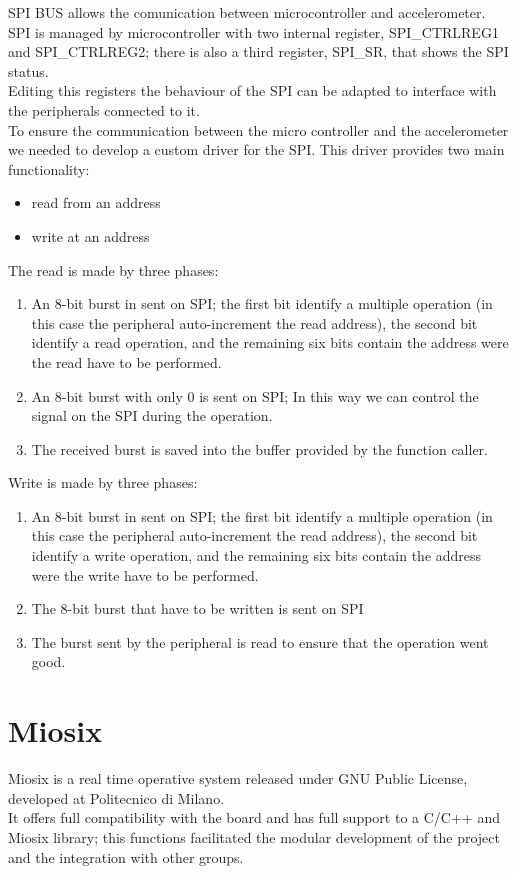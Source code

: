 \documentclass[a4paper,12pt,oneside]{report}
\begin{document}
SPI BUS allows the comunication between microcontroller and accelerometer.
SPI is managed by microcontroller with two internal register,
SPI\_CTRLREG1 and SPI\_CTRLREG2; there is also a third register,
SPI\_SR, that shows the SPI status.\\
Editing this registers the behaviour of the SPI can be adapted to interface with the peripherals connected to it.\\
To ensure the communication between the micro controller and the accelerometer we needed to develop a custom driver
for the SPI. This driver provides two main functionality:
\begin{itemize}
\item read from an address
\item write at an address
\end{itemize}
The read is made by three phases:
\begin{enumerate}
\item An 8-bit burst in sent on SPI; the first bit
identify a multiple operation (in this case the peripheral auto-increment the read address), the second bit identify a read operation,
and the remaining six bits contain the address were the read have to be performed.
\item An 8-bit burst with only 0 is sent on SPI;
In this way we can control the signal on the SPI during the operation.
\item The received burst is saved into the buffer provided by the function caller.
\end{enumerate}
Write is made by three phases:
\begin{enumerate}
\item An 8-bit burst in sent on SPI; the first bit
identify a multiple operation (in this case the peripheral auto-increment the read address), the second bit identify a write operation,
and the remaining six bits contain the address were the write have to be performed.
\item The 8-bit burst that have to be written is sent on SPI
\item The burst sent by the peripheral is read to ensure that the operation went good.
\end{enumerate}

\section{Miosix}

Miosix is a real time operative system released under GNU
Public License, developed at Politecnico di Milano.\\
It offers full compatibility with the board and has full support to 
a C/C++ and Miosix library; this functions facilitated the modular development of the project
and the integration with other groups.
\end{document}
